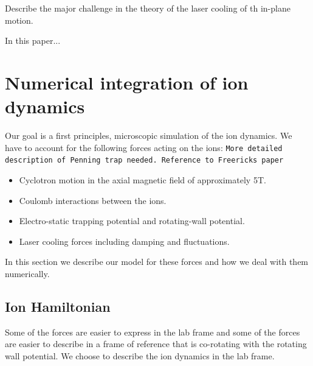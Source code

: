 \documentclass[
  aps,
  reprint,
  twoside,
  showpacs,
  amsmath,
  amssymb,
  floatfix
]{revtex4-1}
\newcommand{\domcomment}[1]{{\tt #1}}
\begin{document}
Describe the major challenge in the theory of the laser cooling of th
in-plane motion.

In this paper...

\section{Numerical integration of ion dynamics}
\label{sec:integrators}

Our goal is a first principles, microscopic simulation of the ion
dynamics.  We have to account for the
following forces acting on the ions:
\domcomment{More detailed description of Penning trap needed.
  Reference to Freericks paper}
\begin{itemize}

\item Cyclotron motion in the axial magnetic field of approximately 5T.

\item Coulomb interactions between the ions.

\item Electro-static trapping potential and rotating-wall potential.

\item Laser cooling forces including damping and fluctuations.

\end{itemize}

In this section we describe our model for these forces and how we deal
with them numerically.


\subsection{Ion Hamiltonian}
\label{ssec:Hamiltonian}

Some of the forces are easier to express in the lab frame and some of
the forces are easier to describe in a frame of reference that is
co-rotating with the rotating wall potential.  We choose to describe the
ion dynamics in the lab frame.
\end{document}
